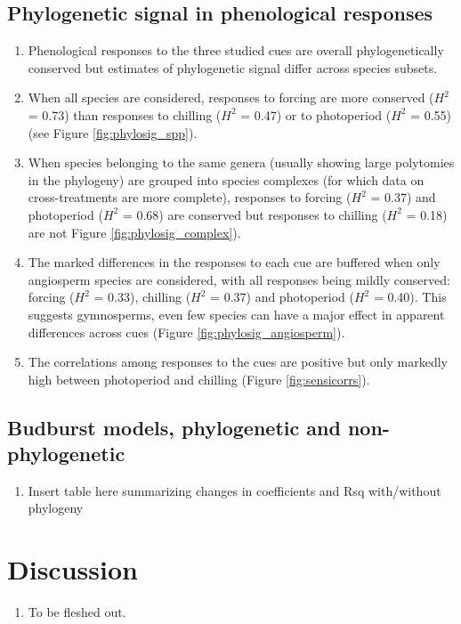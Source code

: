 \documentclass{article}\usepackage[]{graphicx}\usepackage[]{color}
\begin{document}
\subsection*{Phylogenetic signal in phenological responses}
\begin{enumerate}
\item Phenological responses to the three studied cues are overall phylogenetically conserved but estimates of phylogenetic signal differ across species subsets.
\item When all species are considered, responses to forcing are more conserved ($H^{2}$ = 0.73) than responses to chilling ($H^{2}$ = 0.47) or to photoperiod ($H^{2}$ = 0.55) (see Figure \ref{fig:phylosig_spp}).  
\item When species belonging to the same genera (usually showing large polytomies in the phylogeny) are grouped into species complexes (for which data on cross-treatments are more complete), responses to forcing ($H^{2}$ = 0.37) and photoperiod ($H^{2}$ = 0.68) are conserved but responses to chilling ($H^{2}$ = 0.18) are not Figure \ref{fig:phylosig_complex}).  
\item The marked differences in the responses to each cue are buffered when only angiosperm species are considered, with all responses being mildly conserved: forcing ($H^{2}$ = 0.33), chilling ($H^{2}$ = 0.37) and photoperiod ($H^{2}$ = 0.40). This suggests gymnosperms, even few species can have a major  effect in apparent differences across cues (Figure \ref{fig:phylosig_angiosperm}). 
\item The correlations among responses to the cues are positive but only markedly high between photoperiod and chilling (Figure \ref{fig:sensicorrs}).
\end{enumerate}


\subsection*{Budburst models, phylogenetic and non-phylogenetic}
\begin{enumerate}
\item Insert table here summarizing changes in coefficients and Rsq with/without phylogeny
\end{enumerate}




\section*{Discussion}
\begin{enumerate}
\item To be fleshed out.
  

\end{enumerate}
\end{document}
